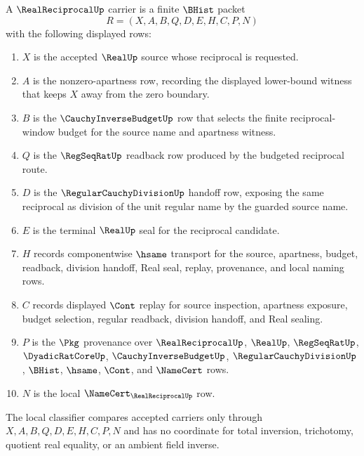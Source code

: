\begin{definition}
\label{def:real-reciprocal-carrier}
A $\RealReciprocalUp$ carrier is a finite $\BHist$ packet
$$
R=(X,A,B,Q,D,E,H,C,P,N)
$$
with the following displayed rows:
\begin{enumerate}
\item $X$ is the accepted $\RealUp$ source whose reciprocal is requested.
\item $A$ is the nonzero-apartness row, recording the displayed lower-bound witness that keeps $X$ away from the zero boundary.
\item $B$ is the $\CauchyInverseBudgetUp$ row that selects the finite reciprocal-window budget for the source name and apartness witness.
\item $Q$ is the $\RegSeqRatUp$ readback row produced by the budgeted reciprocal route.
\item $D$ is the $\RegularCauchyDivisionUp$ handoff row, exposing the same reciprocal as division of the unit regular name by the guarded source name.
\item $E$ is the terminal $\RealUp$ seal for the reciprocal candidate.
\item $H$ records componentwise $\hsame$ transport for the source, apartness, budget, readback, division handoff, Real seal, replay, provenance, and local naming rows.
\item $C$ records displayed $\Cont$ replay for source inspection, apartness exposure, budget selection, regular readback, division handoff, and Real sealing.
\item $P$ is the $\Pkg$ provenance over $\RealReciprocalUp$, $\RealUp$, $\RegSeqRatUp$, $\DyadicRatCoreUp$, $\CauchyInverseBudgetUp$, $\RegularCauchyDivisionUp$, $\BHist$, $\hsame$, $\Cont$, and $\NameCert$ rows.
\item $N$ is the local $\NameCert_{\RealReciprocalUp}$ row.
\end{enumerate}
The local classifier compares accepted carriers only through $X,A,B,Q,D,E,H,C,P,N$ and has no coordinate for total inversion, trichotomy, quotient real equality, or an ambient field inverse.
\end{definition}

